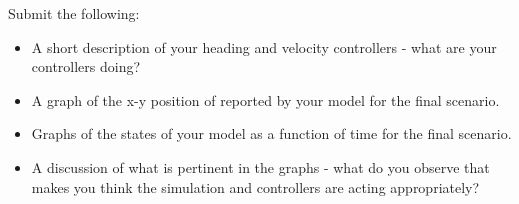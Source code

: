 \begin{ex}
Submit the following:
\begin{itemize}
\item A short description of your heading and velocity controllers - what are your controllers doing?
\item A graph of the x-y position of reported by your model for the final scenario.
\item Graphs of the states of your model as a function of time for the final scenario.
\item A discussion of what is pertinent in the graphs - what do you observe that makes you think the simulation and controllers are acting appropriately?
\end{itemize}
\end{ex}





